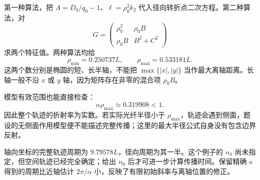 \documentclass[12pt,a4paper,fontset=fandol]{ctexart}
\begin{document}
第一种算法，把 \(A=D_0/q_0-1\)、\(\ell=\rho_0^2k_2\)
代入径向转折点二次方程。第二种算法，对 \[
G=\begin{pmatrix}
\rho_0^2&\rho_0B\\
\rho_0B&B^2+C^2
\end{pmatrix}
\] 求两个特征值。两种算法均给 \[
\rho_{\min}=0.250737L,\qquad
\boxed{\rho_{\max}=0.533181L.}
\] 这两个数分别是椭圆的短、长半轴，不能把 \(\max\{|x|,|y|\}\)
当作最大离轴距离。长轴一般不沿 \(x\) 或 \(y\)
轴，因为矩阵存在非零的混合项 \(\rho_0B\)。

模型有效范围也能直接检查： \[
\alpha\rho_{\max}\approx0.319908<1.
\] 因此整个轨迹的折射率为实数。若实际光纤半径小于
\(\rho_{\max}\)，轨迹会遇到侧面，题设的无侧面作用模型便不能描述完整传播；这里的最大半径公式自身没有包含边界反射。

轴向坐标的完整轨迹周期为 \(9.79578L\)，径向周期为其一半。这个例子的
\(n_0\) 尚未指定，但空间轨迹已经完全确定；给出 \(n_0\)
后才可进一步计算传播时间。保留精确 \(\kappa\) 得到的周期比近轴估计
\(2\pi/\alpha\) 小，反映了有限初始斜率与离轴位置的修正。
\end{document}

